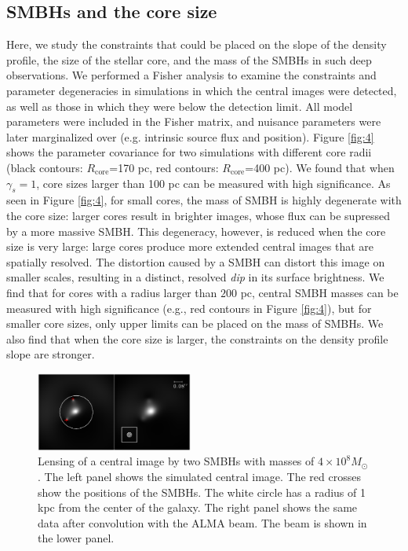 \documentclass[chicago]{emulateapj}
\begin{document}
\subsection{SMBHs and the core size}
Here, we study the constraints that could be placed on the slope of the density profile, the size of the stellar core, and the mass of the SMBHs in such deep observations. 
We performed a Fisher analysis to examine the constraints and parameter degeneracies in simulations in which the central images were detected, as well as those in which they were below the detection limit. All model parameters were included in the Fisher matrix, and nuisance parameters were later marginalized over (e.g. intrinsic source flux and position).  
 Figure \ref{fig:4} shows the parameter covariance for two simulations with different core radii (black contours:  $R_{\mathrm{core}}$=170 pc, red contours: $R_{\mathrm{core}}$=400 pc).
We found that when $\gamma_s=1$, core sizes larger than 100 pc can be measured with high significance. As seen in Figure \ref{fig:4}, 
for small cores, the mass of SMBH is highly degenerate with the core size: larger cores result in brighter images, whose flux can be supressed by a more massive SMBH.
This degeneracy,  however,  is reduced when the core size is very large: large cores produce more extended central images that are spatially resolved. The distortion caused by a SMBH can distort this image on smaller scales, resulting in a distinct, resolved \emph{dip} in its surface brightness. 
We find that for cores with a radius larger than $200$ pc, central SMBH masses can be measured with high significance (e.g., red contours in Figure \ref{fig:4}), but for smaller core sizes, only upper limits can be placed on the mass of SMBHs.
We also find that when the core size is larger, the constraints on the density profile slope are stronger.





\begin{figure}
\begin{center}
\centering
\includegraphics[trim= 20 0 20 0, width=0.46\textwidth]{figures/f_05.eps}
\centering
\end{center}
\caption{ Lensing of a central image by two SMBHs with masses of $4\times 10^8M_{\odot}$. The left panel shows the simulated central image. The red crosses show the positions of the SMBHs. The white circle has a radius of 1 kpc  from the center of the galaxy. The right panel shows the same data after convolution with the ALMA beam. The beam is shown in the lower panel.
\label{fig:5}}
\end{figure}
\end{document}
